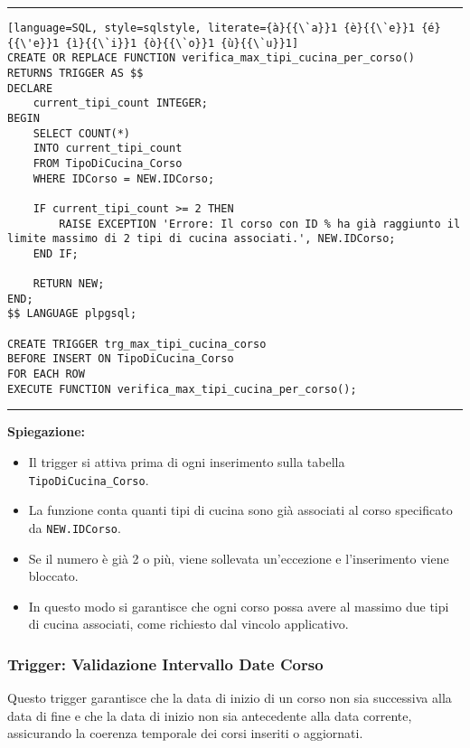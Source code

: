 \noindent\rule{\textwidth}{0.4pt}
\begin{lstlisting}[language=SQL, style=sqlstyle, literate={à}{{\`a}}1 {è}{{\`e}}1 {é}{{\'e}}1 {ì}{{\`i}}1 {ò}{{\`o}}1 {ù}{{\`u}}1]
CREATE OR REPLACE FUNCTION verifica_max_tipi_cucina_per_corso()
RETURNS TRIGGER AS $$
DECLARE
    current_tipi_count INTEGER;
BEGIN
    SELECT COUNT(*)
    INTO current_tipi_count
    FROM TipoDiCucina_Corso
    WHERE IDCorso = NEW.IDCorso;

    IF current_tipi_count >= 2 THEN
        RAISE EXCEPTION 'Errore: Il corso con ID % ha già raggiunto il limite massimo di 2 tipi di cucina associati.', NEW.IDCorso;
    END IF;

    RETURN NEW;
END;
$$ LANGUAGE plpgsql;

CREATE TRIGGER trg_max_tipi_cucina_corso
BEFORE INSERT ON TipoDiCucina_Corso
FOR EACH ROW
EXECUTE FUNCTION verifica_max_tipi_cucina_per_corso();
\end{lstlisting}
\noindent\rule{\textwidth}{0.4pt}

\textbf{Spiegazione:}
\begin{itemize}
    \item Il trigger si attiva prima di ogni inserimento sulla tabella \texttt{TipoDiCucina\_Corso}.
    \item La funzione conta quanti tipi di cucina sono già associati al corso specificato da \texttt{NEW.IDCorso}.
    \item Se il numero è già 2 o più, viene sollevata un'eccezione e l'inserimento viene bloccato.
    \item In questo modo si garantisce che ogni corso possa avere al massimo due tipi di cucina associati, come richiesto dal vincolo applicativo.
\end{itemize}

\subsubsection{Trigger: Validazione Intervallo Date Corso}

Questo trigger garantisce che la data di inizio di un corso non sia successiva alla data di fine e che la data di inizio non sia antecedente alla data corrente, assicurando la coerenza temporale dei corsi inseriti o aggiornati.

